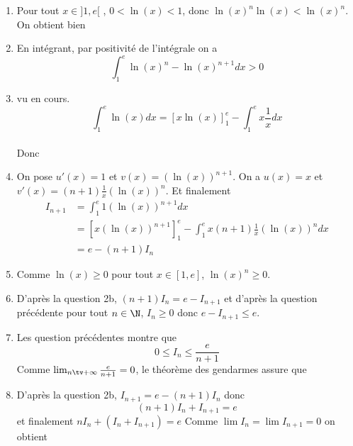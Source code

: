 \begin{correction}
\begin{enumerate}
\item Pour tout $x\in ]1,e[ $ , $0<\ln(x) <1$, donc $\ln(x)^n \ln(x)< \ln(x)^n $. On obtient bien 
\item En intégrant, par positivité de l'intégrale on a 
$$\int_1^e \ln(x)^n -\ln(x)^{n+1}dx >0$$

\item vu en cours. 
$$\int_1^e \ln(x) dx= [x\ln(x)]_1^e - \int_1^e x \frac{1}{x}dx$$\\
Donc 

\item On pose $u'(x)= 1$ et $v(x) = (\ln(x))^{n+1}$. On  a
$u(x)=x$ et $v'(x) = (n+1) \frac{1}{x}  (\ln(x))^{n}$. Et finalement 
\begin{align*}
I_{n+1} &=  \int_1^e 1 (\ln(x))^{n+1} dx\\
			 &= [x (\ln(x))^{n+1}]^e_1 -\int_1^e  x  (n+1) \frac{1}{x}  (\ln(x))^{n} dx  \\
			  &= e -(n+1)I_n 
\end{align*}

\item Comme $\ln(x)\geq 0$ pour tout $x\in [1,e]$, $\ln(x)^n\geq 0$.
\item D'après la question 2b, $(n+1)I_n = e -I_{n+1}$ et d'après la question précédente pour tout $n\in\N$, $I_n \geq 0$ donc 
$e-I_{n+1} \leq e$. 
\item Les question précédentes montre que 
$$0\leq I_n \leq \frac{e}{n+1}$$
Comme $\lim_{n\tv+\infty} \frac{e}{n+1}=0$, le théorème des gendarmes assure que 

\item D'après la question 2b, $I_{n+1} = e- (n+1)I_n$ donc 
$$(n+1)I_n+I_{n+1} =e$$
et finalement 
$nI_n + (I_n +I_{n+1}) =e$
Comme $\lim I_n = \lim I_{n+1} =0$ on obtient 

\end{enumerate}
\end{correction}







